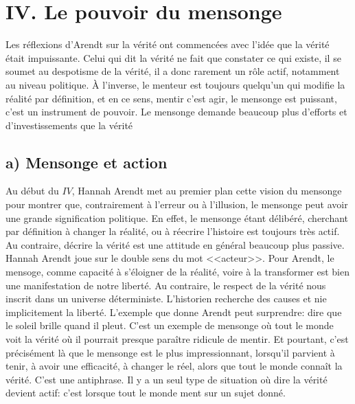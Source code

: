 \documentclass[12pt]{article}
\begin{document}
\section*{\color{red}IV. Le pouvoir du mensonge}
Les réflexions d'Arendt sur la vérité ont commencées avec l'idée que la vérité était impuissante.
Celui qui dit la vérité ne fait que constater ce qui existe, il se soumet au despotisme de la vérité, il a donc rarement un rôle actif, notamment au niveau politique.
À l'inverse, le menteur est toujours quelqu'un qui modifie la réalité par définition, et en ce sens, mentir c'est agir, le mensonge est puissant, c'est un instrument de pouvoir.
Le mensonge demande beaucoup plus d'efforts et d'investissements que la vérité
\subsection*{a) Mensonge et action}
Au début du $IV$, Hannah Arendt met au premier plan cette vision du mensonge pour montrer que, contrairement à l'erreur ou à l'illusion, le mensonge peut avoir une grande signification politique.
En effet, le mensonge étant délibéré, cherchant par définition à changer la réalité, ou à réecrire l'histoire est toujours très actif.
Au contraire, décrire la vérité est une attitude en général beaucoup plus passive.
Hannah Arendt joue sur le double sens du mot <<acteur>>.
Pour Arendt, le mensoge, comme capacité à s'éloigner de la réalité, voire à la transformer est bien une manifestation de notre liberté.
Au contraire, le respect de la vérité nous inscrit dans un universe déterministe.
L'historien recherche des causes et nie implicitement la liberté.
L'exemple que donne Arendt peut surprendre: dire que le soleil brille quand il pleut. C'est un exemple de mensonge où tout le monde voit la vérité où il pourrait presque paraître ridicule de mentir.
Et pourtant, c'est précisément là que le mensonge est le plus impressionnant, lorsqu'il parvient à tenir, à avoir une efficacité, à changer le réel, alors que tout le monde connaît la vérité.
C'est une antiphrase. Il y a un seul type de situation où dire la vérité devient actif: c'est lorsque tout le monde ment sur un sujet donné.
\end{document}

